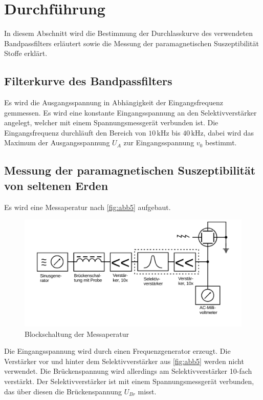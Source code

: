 \section{Durchführung}
\label{sec:Durchführung}
In diesem Abschnitt wird die Bestimmung der Durchlasskurve des verwendeten Bandpassfilters erläutert sowie die Messung der paramagnetischen Suszeptibilität Stoffe erklärt.

\subsection{Filterkurve des Bandpassfilters}
Es wird die Ausgangsspannung in Abhängigkeit der Eingangsfrequenz gemmessen. Es wird eine konstante Eingangsspannung an den Selektivverstärker angelegt, welcher mit einem Spannungsmessgerät verbunden ist. 
Die Eingangsfrequenz durchläuft den Bereich von $ 10 \, \unit{\kilo\hertz}$ bis $40 \, \unit{\kilo\hertz}$, dabei wird das Maximum der Ausgangsspannung $ U_{A} $ zur Eingangsspannung $ v_0$ bestimmt.


\subsection{Messung der paramagnetischen Suszeptibilität von seltenen Erden}
Es wird eine Messaperatur nach \autoref{fig:abb5} aufgebaut.
\begin{figure}[H]
    \centering
    \includegraphics{figures/Abb_5.pdf}
    \caption{Blockschaltung der Messaperatur}
    \label{fig:abb5}
\end{figure} 

Die Eingangsspannung wird durch einen Frequenzgenerator erzeugt.
Die Verstärker vor und hinter dem Selektivverstärker aus \autoref{fig:abb5} werden nicht verwendet. Die Brückenspannung wird allerdings am Selektivverstärker 10-fach verstärkt. Der Selektivverstärker ist mit einem Spannungsmessgerät verbunden, das über diesen die Brückenspannung $ U_{Br}$ misst.\\

